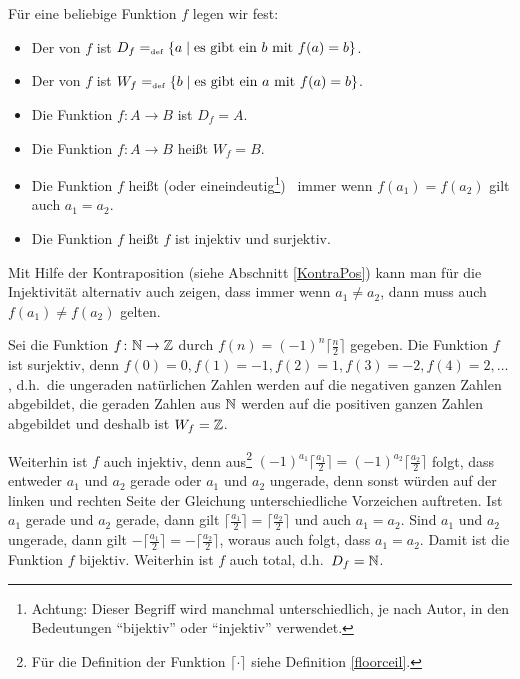 \begin{definition}
Für eine beliebige Funktion $f$ legen wir fest:
\begin{itemize}
%
\item Der  von $f$ ist $D_f =_{\mathrm{\scriptscriptstyle def}}
\{a \mid \text{es gibt ein $b$ mit $f(a) = b$}\}$.
%
\item Der  von $f$ ist $W_f =_{\mathrm{\scriptscriptstyle def}}
\{b \mid \text{es gibt ein $a$ mit $f(a) = b$}\}$.
%
\item Die Funktion $f \colon A \rightarrow B$ ist  \gdw $D_f
= A$.
% 
\item Die Funktion $f \colon A \rightarrow B$ heißt  \gdw $W_f = B$.
%
\item Die Funktion $f$ heißt  (oder
eineindeutig\footnote{Achtung: Dieser Begriff wird manchmal
unterschiedlich, je nach Autor, in den Bedeutungen "`bijektiv"' oder
"`injektiv"' verwendet.}) \gdw\ immer wenn $f(a_1)\allowbreak =
f(a_2)$ gilt auch $a_1 = a_2$.
%
\item Die Funktion $f$ heißt  \gdw $f$ ist injektiv und surjektiv.
\end{itemize}
\end{definition}
Mit Hilfe der Kontraposition (siehe Abschnitt \ref{KontraPos}) kann
man für die Injektivität alternativ auch zeigen, dass immer wenn
$a_1 \not= a_2$, dann muss auch $f(a_1) \not= f(a_2)$ gelten.

\begin{example}
Sei die Funktion $f \colon \mathbb N \rightarrow \mathbb Z$ durch $f(n) = (-1)^n
\lceil \frac{n}{2} \rceil$ gegeben. Die Funktion $f$ ist surjektiv,
denn $f(0) = 0, f(1) = -1, f(2) = 1, f(3) = -2, f(4) = 2, \dots$, d.h.~die 
ungeraden natürlichen Zahlen werden auf die negativen ganzen Zahlen 
abgebildet, die geraden Zahlen aus $\mathbb N$ werden auf die positiven
ganzen Zahlen abgebildet und deshalb ist $W_f = \mathbb Z$.

Weiterhin ist $f$ auch injektiv, denn aus\footnote{Für die Definition
der Funktion $\lceil \cdot \rceil$ siehe Definition \ref{floorceil}.}
$(-1)^{a_1} \lceil \frac{a_1}{2} \rceil = (-1)^{a_2}
\lceil \frac{a_2}{2} \rceil$ folgt, dass entweder $a_1$ und $a_2$
gerade oder $a_1$ und $a_2$ ungerade, denn sonst würden auf der linken
und rechten Seite der Gleichung unterschiedliche Vorzeichen
auftreten. Ist $a_1$ gerade und $a_2$ gerade, dann gilt
$\lceil \frac{a_1}{2} \rceil = \lceil \frac{a_2}{2} \rceil$ und auch
$a_1 = a_2$. Sind $a_1$ und $a_2$ ungerade, dann gilt
$-\lceil \frac{a_1}{2} \rceil = -\lceil \frac{a_2}{2} \rceil$, woraus
auch folgt, dass $a_1 = a_2$.
%
Damit ist die Funktion $f$ bijektiv. Weiterhin ist $f$ auch total,
d.h.~$D_f = \mathbb N$.
\end{example}

